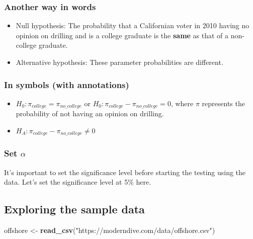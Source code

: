 \documentclass[12pt,]{krantz}
\makeatletter
\newenvironment{Shaded}{\begin{snugshade}}{\end{snugshade}}
\newcommand{\KeywordTok}[1]{\textcolor[rgb]{0.27,0.27,0.27}{\textbf{#1}}}
\newcommand{\StringTok}[1]{\textcolor[rgb]{0.5,0.5,0.5}{#1}}
\newcommand{\NormalTok}[1]{#1}
\providecommand{\tightlist}{%
  \setlength{\itemsep}{0pt}\setlength{\parskip}{0pt}}
\newenvironment{kframe}{%
\medskip{}
\setlength{\fboxsep}{.8em}
 \def\at@end@of@kframe{}%
 \ifinner\ifhmode%
  \def\at@end@of@kframe{\end{minipage}}%
  \begin{minipage}{\columnwidth}%
 \fi\fi%
 \def\FrameCommand##1{\hskip\@totalleftmargin \hskip-\fboxsep
 \colorbox{shadecolor}{##1}\hskip-\fboxsep
     \hskip-\linewidth \hskip-\@totalleftmargin \hskip\columnwidth}%
 \MakeFramed {\advance\hsize-\width
   \@totalleftmargin\z@ \linewidth\hsize
   \@setminipage}}%
 {\par\unskip\endMakeFramed%
 \at@end@of@kframe}
\renewenvironment{Shaded}{\begin{kframe}}{\end{kframe}}
\theoremstyle{definition}
\theoremstyle{definition}
\theoremstyle{definition}
\theoremstyle{remark}
\makeatother
\begin{document}
\subsubsection*{Another way in words}\label{another-way-in-words}


\begin{itemize}
\item
  Null hypothesis: The probability that a Californian voter in 2010
  having no opinion on drilling and is a college graduate is the
  \textbf{same} as that of a non-college graduate.
\item
  Alternative hypothesis: These parameter probabilities are different.
\end{itemize}

\subsubsection*{In symbols (with
annotations)}\label{in-symbols-with-annotations-2}


\begin{itemize}
\tightlist
\item
  \(H_0: \pi_{college} = \pi_{no\_college}\) or
  \(H_0: \pi_{college} - \pi_{no\_college} = 0\), where \(\pi\)
  represents the probability of not having an opinion on drilling.
\item
  \(H_A: \pi_{college} - \pi_{no\_college} \ne 0\)
\end{itemize}

\subsubsection*{\texorpdfstring{Set
\(\alpha\)}{Set \textbackslash{}alpha}}\label{set-alpha-2}


It's important to set the significance level before starting the testing
using the data. Let's set the significance level at 5\% here.

\subsection{Exploring the sample
data}\label{exploring-the-sample-data-2}

\begin{Shaded}
\begin{Highlighting}[]
\NormalTok{offshore <-}\StringTok{ }\KeywordTok{read_csv}\NormalTok{(}\StringTok{"https://moderndive.com/data/offshore.csv"}\NormalTok{)}
\end{Highlighting}
\end{Shaded}
\end{document}
